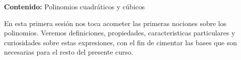 {\large
    \textbf{Contenido:}  Polinomios cuadráticos y cúbicos
}

En esta primera sesión nos toca acometer las primeras nociones sobre los polinomios.
Veremos definiciones, propiedades, caracteristicas particulares y curiosidades sobre
estas expresiones, con el fin de cimentar las bases que son necesarias para el resto
del presente curso.